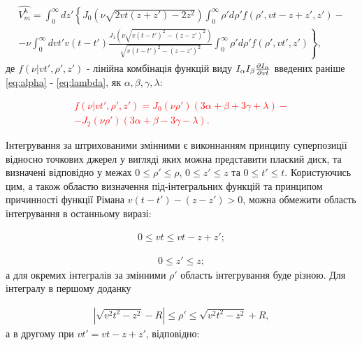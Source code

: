\begin{equation} \begin{aligned}
\hat{V_m^h} = \int_{0}^{\infty} dz'
\left\{ J_0 \left( \nu \sqrt{2 vt (z + z') - 2 z^2} \right) 
\int_{0}^{\infty} \rho' d \rho'
f (\rho',vt - z + z',z') - \right. \\ 
\left. - \nu \int_{0}^{\infty} dvt' v (t-t') 
\frac{J_1 \left( \nu \sqrt{v(t-t')^2 - (z-z')^2} \right)}
{\sqrt{v(t-t')^2 - (z-z')^2}} 
\int_{0}^{\infty} \rho' d\rho'
f (\rho',vt',z')  \right\},
\end{aligned} \end{equation}
%
де $ f ( \nu | vt', \rho', z') $ - лінійна комбінація функцій виду
$ I_\alpha I_\beta \frac{\partial I_\alpha}{\partial vt} $ введених раніше 
\eqref{eq:alpha} - \eqref{eq:lambda}, як $ \alpha, \beta, \gamma, \lambda $:

\textcolor{red} { \begin{equation} \begin{aligned}
f ( \nu | vt', \rho', z') = 
J_0 (\nu \rho') (3 \alpha + \beta + 3 \gamma + \lambda) - \\
- J_2 (\nu \rho') (3 \alpha + \beta - 3 \gamma - \lambda).
\end{aligned} \end{equation} }

Інтегрування за штрихованими змінними є виконнанням принципу суперпозиції 
відносно точкових джерел у вигляді яких можна представити плаский диск, та
визначені відповідно у межах $ 0 \leq \rho' \leq \rho $,
$ 0 \leq z' \leq z $ та $ 0 \leq t' \leq t $. Користуючись цим, а також 
областю визначення під-інтегральних функцій та принципом причинності функції 
Рімана $ v(t-t')-(z-z') > 0 $, можна обмежити область інтегрування в 
останньому виразі:

\begin{equation} \begin{aligned}
0 \leq vt \leq vt - z + z';
\end{aligned} \end{equation}

\begin{equation} \begin{aligned}
0 \leq z' \leq z;
\end{aligned} \end{equation}
%
а для окремих інтегралів за змінними $ \rho' $ область інтегрування буде 
різною. Для інтегралу в першому доданку

\begin{equation} \begin{aligned}
\left| \sqrt{v^2t^2 - z^2} - R \right| \leq \rho' \leq 
\sqrt{v^2t^2 - z^2} + R,
\end{aligned} \end{equation}
%
а в другому при $ vt' = vt - z + z' $, відповідно:

